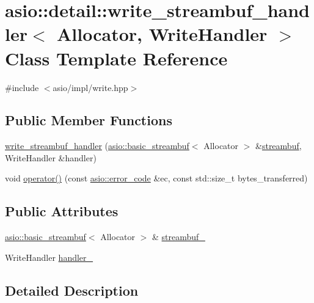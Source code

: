 \hypertarget{classasio_1_1detail_1_1write__streambuf__handler}{}\section{asio\+:\+:detail\+:\+:write\+\_\+streambuf\+\_\+handler$<$ Allocator, Write\+Handler $>$ Class Template Reference}
\label{classasio_1_1detail_1_1write__streambuf__handler}


{\ttfamily \#include $<$asio/impl/write.\+hpp$>$}

\subsection*{Public Member Functions}
\begin{DoxyCompactItemize}
\item 
\hyperlink{classasio_1_1detail_1_1write__streambuf__handler_a706287ae77ec1e8a295d6f325342ae85}{write\+\_\+streambuf\+\_\+handler} (\hyperlink{classasio_1_1basic__streambuf}{asio\+::basic\+\_\+streambuf}$<$ Allocator $>$ \&\hyperlink{namespaceasio_a6a7ba348943527312eeace3492bf32ee}{streambuf}, Write\+Handler \&handler)
\item 
void \hyperlink{classasio_1_1detail_1_1write__streambuf__handler_a9459023060a0b5e0cd73e08471307ded}{operator()} (const \hyperlink{classasio_1_1error__code}{asio\+::error\+\_\+code} \&ec, const std\+::size\+\_\+t bytes\+\_\+transferred)
\end{DoxyCompactItemize}
\subsection*{Public Attributes}
\begin{DoxyCompactItemize}
\item 
\hyperlink{classasio_1_1basic__streambuf}{asio\+::basic\+\_\+streambuf}$<$ Allocator $>$ \& \hyperlink{classasio_1_1detail_1_1write__streambuf__handler_a5398d2ea03dcbf5191fc89e167f4026b}{streambuf\+\_\+}
\item 
Write\+Handler \hyperlink{classasio_1_1detail_1_1write__streambuf__handler_a1f3a23000dc4fe93e7c2a5dfbce80f54}{handler\+\_\+}
\end{DoxyCompactItemize}


\subsection{Detailed Description}
